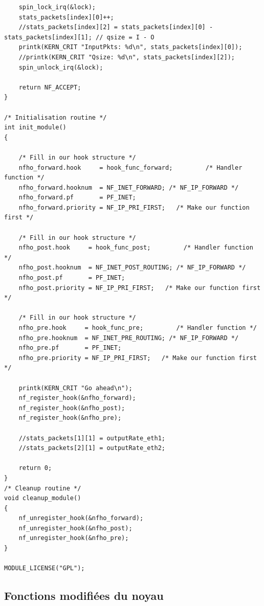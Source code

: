 \documentclass[a4paper]{article}
\begin{document}
\begin{verbatim}
	spin_lock_irq(&lock);
	stats_packets[index][0]++;
	//stats_packets[index][2] = stats_packets[index][0] - stats_packets[index][1]; // qsize = I - O
	printk(KERN_CRIT "InputPkts: %d\n", stats_packets[index][0]);
	//printk(KERN_CRIT "Qsize: %d\n", stats_packets[index][2]);
	spin_unlock_irq(&lock);

	return NF_ACCEPT;
}

/* Initialisation routine */
int init_module()
{

	/* Fill in our hook structure */
	nfho_forward.hook     = hook_func_forward;         /* Handler function */
	nfho_forward.hooknum  = NF_INET_FORWARD; /* NF_IP_FORWARD */
	nfho_forward.pf       = PF_INET;
	nfho_forward.priority = NF_IP_PRI_FIRST;   /* Make our function first */

	/* Fill in our hook structure */
	nfho_post.hook     = hook_func_post;         /* Handler function */
	nfho_post.hooknum  = NF_INET_POST_ROUTING; /* NF_IP_FORWARD */
	nfho_post.pf       = PF_INET;
	nfho_post.priority = NF_IP_PRI_FIRST;   /* Make our function first */

	/* Fill in our hook structure */
	nfho_pre.hook     = hook_func_pre;         /* Handler function */
	nfho_pre.hooknum  = NF_INET_PRE_ROUTING; /* NF_IP_FORWARD */
	nfho_pre.pf       = PF_INET;
	nfho_pre.priority = NF_IP_PRI_FIRST;   /* Make our function first */

	printk(KERN_CRIT "Go ahead\n");
	nf_register_hook(&nfho_forward);
	nf_register_hook(&nfho_post);
	nf_register_hook(&nfho_pre);

	//stats_packets[1][1] = outputRate_eth1;
	//stats_packets[2][1] = outputRate_eth2;

	return 0;
}
/* Cleanup routine */
void cleanup_module()
{
	nf_unregister_hook(&nfho_forward);
	nf_unregister_hook(&nfho_post);
	nf_unregister_hook(&nfho_pre);
}

MODULE_LICENSE("GPL");

\end{verbatim}

\subsection{Fonctions modifiées du noyau}
\end{document}
